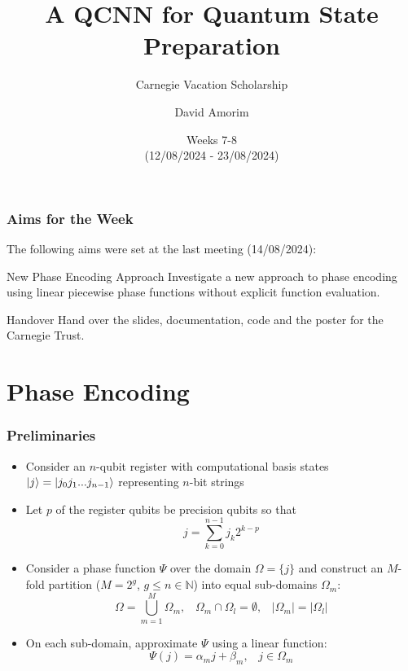 \documentclass{beamer}
\title[QCNN State Preparation]{A QCNN for Quantum State Preparation}
\subtitle{Carnegie Vacation Scholarship}
\author[David Amorim]{David Amorim}
\institute[]{}
\date[21/08/2024]{Weeks 7-8 \\(12/08/2024 - 23/08/2024)}
\begin{document}
\frame{\titlepage}

\begin{frame}
\frametitle{Aims for the Week}
The following aims were set at the last meeting (14/08/2024):

\begin{alertblock}{New Phase Encoding Approach}
Investigate a new approach to phase encoding using linear piecewise phase functions without explicit function evaluation.  
\end{alertblock}

\begin{alertblock}{Handover}
Hand over the slides, documentation, code and the poster for the Carnegie Trust.
\end{alertblock}
\end{frame}

\section{Phase Encoding}

\begin{frame}
\frametitle{Preliminaries}

\begin{itemize}
\item Consider an \alert{$n$-qubit} register with computational basis states $\ket{j} = \ket{j_0 j_1 ... j_{n-1}}$ representing $n$-bit strings
\item Let \alert{$p$} of the register qubits be \alert{precision qubits} so that 
\begin{equation}
j = \sum^{n -1}_{k=0} j_k 2^{k-p}
\end{equation} 
\item Consider a \alert{phase function} $\Psi$ over the domain $\Omega = \{ j \}$ and construct an \alert{$M$-fold partition} ($M = 2^g$, $g \leq n \in \mathbb{N}$) into equal sub-domains $\Omega_m$:
\begin{equation}
\Omega = \bigcup_{m=1}^M \Omega_m, \; \; \; \Omega_m \cap \Omega_l = \emptyset, \;  \; \; |\Omega_m| = |\Omega_l|
\end{equation}
\item On each sub-domain, approximate $\Psi$ using a \alert{linear function}:
\begin{equation}
\Psi(j) = \alpha_m j + \beta_m, \; \; \; j \in \Omega_m
\end{equation}
\end{itemize}

\end{frame}
\end{document}

